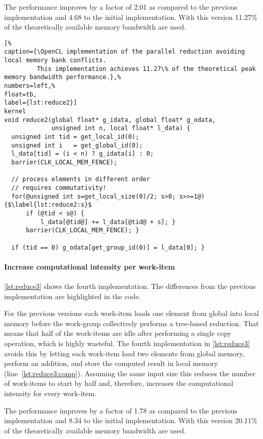 The performance improves by a factor of 2.01 as compared to the previous implementation and 4.68 to the initial implementation.
With this version 11.27\% of the theoretically available memory bandwidth are used.


\begin{lstlisting}[%                                                             
caption={\OpenCL implementation of the parallel reduction avoiding local memory bank conflicts.
         This implementation achieves 11.27\% of the theoretical peak memory bandwidth performance.},%
numbers=left,%
float=tb,
label={lst:reduce2}]
kernel
void reduce2(global float* g_idata, global float* g_odata,
             unsigned int n, local float* l_data) {
  unsigned int tid = get_local_id(0);
  unsigned int i   = get_global_id(0);
  l_data[tid] = (i < n) ? g_idata[i] : 0;
  barrier(CLK_LOCAL_MEM_FENCE);

  // process elements in different order
  // requires commutativity!
  for(@unsigned int s=get_local_size(0)/2; s>0; s>>=1@) {$\label{lst:reduce2:s}$
      if (@tid < s@) {
          l_data[@tid@] += l_data[@tid@ + s]; }
      barrier(CLK_LOCAL_MEM_FENCE); }

  if (tid == 0) g_odata[get_group_id(0)] = l_data[0]; }
\end{lstlisting}

\newpage

\paragraph{Increase computational intensity per work-item}

\autoref{lst:reduce3} shows the fourth implementation.
The differences from the previous implementation are highlighted in the code.

For the previous versions each work-item loads one element from global into local memory before the work-group collectively performs a tree-based reduction.
That means that half of the work-items are idle after performing a single copy operation, which is highly wasteful.
The fourth implementation in \autoref{lst:reduce3} avoids this by letting each work-item load two elements from global memory, perform an addition, and store the computed result in local memory (line~\ref{lst:reduce3:comp}).
Assuming the same input size this reduces the number of work-items to start by half and, therefore, increases the computational intensity for every work-item.

The performance improves by a factor of 1.78 as compared to the previous implementation and 8.34 to the initial implementation.
With this version 20.11\% of the theoretically available memory bandwidth are used.


